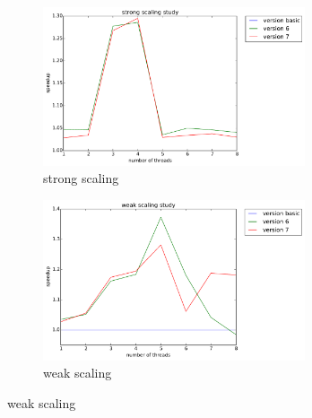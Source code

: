\documentclass[12pt]{article}
\numberwithin{equation}{section}
\begin{document}
\begin{figure}[!ht]
   \begin{subfigure}
      \centering
        \begin{center}
      \includegraphics[width=0.85\textwidth] {plots/cpp_strong_ivdep+simd+flags}
        \end{center}
      \label{aload0}
      \caption{strong scaling}
  \end{subfigure}
  \begin{subfigure}
      \centering
        \begin{center}
      \includegraphics[width=0.85\textwidth] {plots/cpp_weak_ivdep+simd+flags}
        \end{center}
      \label{aload1}
      \caption{weak scaling}
  \end{subfigure}
\end{figure}
\end{document}
